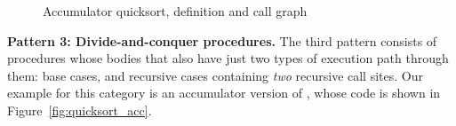 \begin{figure}[tb]
\begin{center}
\begin{minipage}[b][1.9in]{0.49\textwidth}
\hfill
\end{minipage}
\begin{minipage}[b][1.9in]{0.49\textwidth}
\hfill
\end{minipage}
\end{center}
\vspace{-2ex}
\caption{Accumulator quicksort, definition and call graph}
\end{figure}

{\bf Pattern 3: Divide-and-conquer procedures.}
The third pattern consists of procedures whose bodies
that also have just two types of execution path through them:
base cases, and recursive cases containing \emph{two} recursive call sites.
Our example for this category is an accumulator version of \quicksortacc,
whose code is shown in Figure~\ref{fig:quicksort_acc}.

